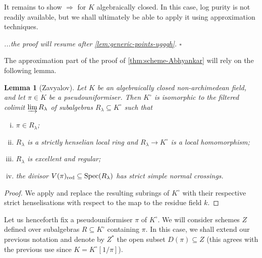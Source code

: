 \documentclass[a4paper,twoside,11pt,reqno]{amsart}
\DeclareMathOperator{\Spec}{Spec}
\newtheorem{lem}[thm]{Lemma}
\theoremstyle{definition}
\numberwithin{equation}{subsection}
\begin{document}
It remains to show $\Rightarrow$ for $K$ algebraically closed. In this case, log purity is not readily available, but we shall ultimately be able to apply it using approximation techniques. 

\hphantom{a} \hfill \emph{...the proof will resume after \cref{lem:generic-points-ugggh}. $\square$}  

\medskip

The approximation part of the proof of \cref{thm:scheme-Abhyankar} will rely on the following lemma. 

\begin{lem}[Zavyalov] \label{lem:Zavyalov}
    Let $K$ be an algebraically closed non-archimedean field, and let $\pi\in K$ be a pseudouniformiser. Then $K^\circ$ is isomorphic to the filtered colimit $\varinjlim R_\lambda$ of subalgebras $R_\lambda\subseteq K^\circ$ such that
    \begin{enumerate}[(i)]
        \item $\pi \in R_\lambda$;
        \item $R_\lambda$ is a strictly henselian local ring and $R_\lambda\to K^\circ$ is a local homomorphism;
        \item $R_\lambda$ is excellent and regular;
        \item the divisor $V(\pi)_{\rm red}\subseteq \Spec(R_\lambda)$ has strict simple normal crossings.
    \end{enumerate}
\end{lem}

\begin{proof}
We apply \cite[Lemma~A.2]{Zavyalov} and replace the resulting subrings of $K^\circ$ with their respective strict henselisations with respect to the map to the residue field $k$.
\end{proof}

Let us henceforth fix a pseudouniformiser $\pi$ of $K^\circ$. We will consider schemes $Z$ defined over subalgebras $R\subseteq K^\circ$ containing $\pi$. In this case, we shall extend our previous notation and denote by $Z^*$ the open subset $D(\pi)\subseteq Z$ (this agrees with the previous use since $K= K^\circ[1/\pi]$).
\end{document}
